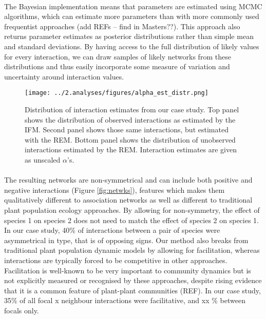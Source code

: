 \documentclass[a4,12pt]{article}
\begin{document}
    \paragraph{}
    The Bayesian implementation means that parameters are estimated using MCMC algorithms, which can estimate more parameters than with more commonly used frequentist approaches (add REFs – find in Masters??). This approach also returns parameter estimates as posterior distributions rather than simple mean and standard deviations. By having access to the full distribution of likely values for every interaction, we can draw samples of likely networks from these distributions and thus easily incorporate some measure of variation and uncertainty around interaction values. %

    \begin{figure}[H]
        \texttt{[image: ../2.analyses/figures/alpha\_est\_distr.png]}
        \caption{Distribution of interaction estimates from our case study. Top panel shows the distribution of observed interactions as estimated by the IFM. Second panel shows those same interactions, but estimated with the REM. Bottom panel shows the distribution of unobserved interactions estimated by the REM. Interaction estimates are given as unscaled \(\alpha\)'s.}
        \label{fig:adist}
    \end{figure}


    \paragraph{}
    The resulting networks are non-symmetrical and can include both positive and negative interactions (Figure \ref{fig:netwks}), features which makes them qualitatively different to association networks as well as different to traditional plant population ecology approaches. By allowing for non-symmetry, the effect of species 1 on species 2 does not need to match the effect of species 2 on species 1. In our case study, 40\% of interactions between a pair of species were asymmetrical in type, that is of opposing signs.
    Our method also breaks from traditional plant population dynamic models by allowing for facilitation, whereas interactions are typically forced to be competitive in other approaches.     Facilitation is well-known to be very important to community dynamics but is not explicitly measured or recognised by these approaches, despite rising evidence that it is a common feature of plant-plant communities (REF). In our case study, 35\% of all focal x neighbour interactions were facilitative, and xx \% between focals only.
\end{document}
